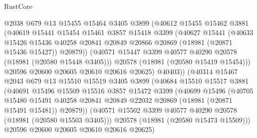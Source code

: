 \begin{lexlean}{RustCore}
\begin{coremodule}
                    @2038
                    @679
                    @13
                    @15455
                    @15464
                    @3405
                    @3899
                    (@40612
                      @15455
                      @15462
                      @3881
                      (@40619
                        @15441
                        @15454
                        @15461
                        @3857
                        @15418
                        @3399
                        (@40627
                          @15441
                          (@40633
                            @15426
                            @15436
                            @40258
                            @20841
                            @20849
                            @20866
                            @20869
                            (@18981 (@20871 @15436 @15427))
                            @20879))
                        (@40571 @15447 @3399 @40577 @40290 @20578 (@18981 (@20580 @15448 @3405)))
                        @20578
                        (@18981 (@20580 @15419 @15454)))
                      @20596
                      @20600
                      @20605
                      @20610
                      @20616
                      @20625)
                    @40403))
                (@40314
                  @15467
                  @2043
                  @679
                  @13
                  @15510
                  @15519
                  @3405
                  @3899
                  (@40684
                    @15510
                    @15517
                    @3881
                    (@40691
                      @15496
                      @15509
                      @15516
                      @3857
                      @15472
                      @3399
                      (@40699
                        @15496
                        (@40705
                          @15480
                          @15491
                          @40258
                          @20841
                          @20849
                          @22032
                          @20869
                          (@18981 (@20871 @15491 @15481))
                          @20879))
                      (@40571 @15502 @3399 @40577 @40290 @20578 (@18981 (@20580 @15503 @3405)))
                      @20578
                      (@18981 (@20580 @15473 @15509)))
                    @20596
                    @20600
                    @20605
                    @20610
                    @20616
                    @20625)

\end{coremodule}
\end{lexlean}
